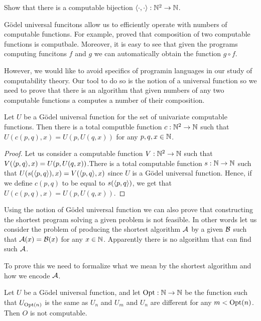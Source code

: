 \begin{exercise}
  Show that there is a computable bijection $\langle {\cdot}, {\cdot} \rangle : {\mathbb{N}}^2 \to {\mathbb{N}}$.
\end{exercise}

G\"odel universal funcitons allow us to efficiently operate with numbers of
computable functions.
For example,  proved that composition of
two computable functions is computbale. Moreover, it is easy to see that given
the programs computing funcitons $f$ and $g$ we can automatically obtain the
function $g \circ f$.

However, we would like to avoid specifics of programin languages in our study of
computability theory. Our tool to do so is the notion of a universal function so
we need to prove that there is an algorithm that given numbers of any two
computable functions a computes a number of their composition.
\begin{theorem}
  Let $U$ be a G\"odel universal function for the set of univariate computable
  functions. Then there is a total computble function $c : {\mathbb{N}}^2 \to {\mathbb{N}}$ such
  that $U(c(p, q), x) = U(p, U(q, x))$ for any $p, q, x \in {\mathbb{N}}$.
\end{theorem}
\begin{proof}
  Let us consider a computable function $V : {\mathbb{N}}^2 \to {\mathbb{N}}$ such that
  $V(\langle {p}, {q} \rangle, x) = U(p, U(q, x))$.There is a total computable function $s :
  {\mathbb{N}} \to {\mathbb{N}}$ such that $U(s(\langle {p}, {q} \rangle), x) = V(\langle {p}, {q} \rangle, x)$ since $U$ is a
  G\"odel universal function. Hence, if we define $c(p, q)$ to be equal to
  $s(\langle {p}, {q} \rangle)$, we get that $U(c(p, q), x) = U(p, U(q, x))$.
\end{proof}

Using the notion of G\"odel universal function we can also prove that
constructing the shortest program solving a given problem is not feasible. In
other words let us consider the problem of producing the shortest algorithm
$\mathcal{A}$ by a given $\mathcal{B}$ such that
$\mathcal{A}(x) = \mathcal{B}(x)$ for any $x \in {\mathbb{N}}$. Apparently there is
no algorithm that can find such $\mathcal{A}$.

To prove this we need to formalize what we mean by the shortest algorithm and
how we encode $\mathcal{A}$.
\begin{theorem}
\label{theorem:program-optimization}
  Let $U$ be a G\"odel universal function, and let $\mathrm{Opt} : {\mathbb{N}} \to {\mathbb{N}}$ be
  the function such that $U_{\mathrm{Opt}(n)}$ is the same as $U_n$ and $U_m$ and
  $U_n$ are different for any $m < \mathrm{Opt}(n)$. Then $O$ is not computable.
\end{theorem}


